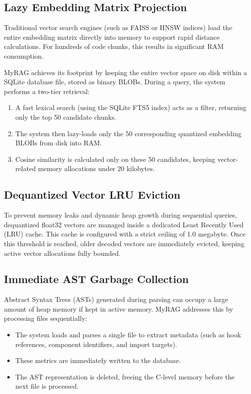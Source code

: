 \documentclass[11pt,a4paper]{article}
\begin{document}
\subsection{Lazy Embedding Matrix Projection}
Traditional vector search engines (such as FAISS or HNSW indices) load the entire embedding matrix directly into memory to support rapid distance calculations. For hundreds of code chunks, this results in significant RAM consumption. 

MyRAG achieves its footprint by keeping the entire vector space on disk within a SQLite database file, stored as binary BLOBs. During a query, the system performs a two-tier retrieval:
\begin{enumerate}
    \item A fast lexical search (using the SQLite FTS5 index) acts as a filter, returning only the top 50 candidate chunks.
    \item The system then lazy-loads only the 50 corresponding quantized embedding BLOBs from disk into RAM.
    \item Cosine similarity is calculated only on these 50 candidates, keeping vector-related memory allocations under 20 kilobytes.
\end{enumerate}

\subsection{Dequantized Vector LRU Eviction}
To prevent memory leaks and dynamic heap growth during sequential queries, dequantized float32 vectors are managed inside a dedicated Least Recently Used (LRU) cache. This cache is configured with a strict ceiling of 1.0 megabyte. Once this threshold is reached, older decoded vectors are immediately evicted, keeping active vector allocations fully bounded.

\subsection{Immediate AST Garbage Collection}
Abstract Syntax Trees (ASTs) generated during parsing can occupy a large amount of heap memory if kept in active memory. MyRAG addresses this by processing files sequentially:
\begin{itemize}
    \item The system loads and parses a single file to extract metadata (such as hook references, component identifiers, and import targets).
    \item These metrics are immediately written to the database.
    \item The AST representation is deleted, freeing the C-level memory before the next file is processed.
\end{itemize}
\end{document}
